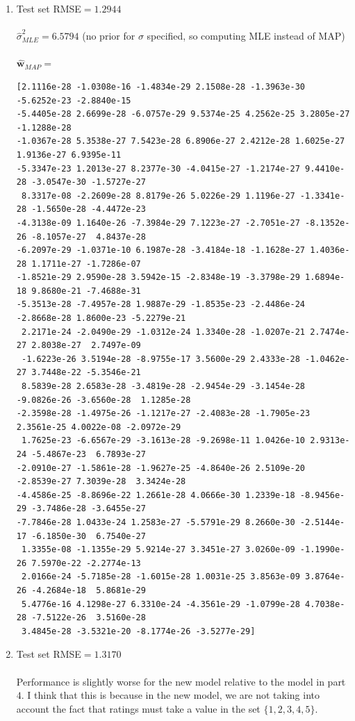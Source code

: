 \documentclass[10pt]{harvardml}
\theoremstyle{plain}
\begin{document}
\begin{enumerate}
\newpage

\item Test set RMSE$=1.2944$\\\\
$\hat\sigma^2_{MLE}=6.5794$ (no prior for $\sigma$ specified, so computing MLE instead of MAP)\\\\
$\mathbf{\hat w}_{MAP}=$
\begin{verbatim}
[2.1116e-28 -1.0308e-16 -1.4834e-29 2.1508e-28 -1.3963e-30 -5.6252e-23 -2.8840e-15
-5.4405e-28 2.6699e-28 -6.0757e-29 9.5374e-25 4.2562e-25 3.2805e-27 -1.1288e-28
-1.0367e-28 5.3538e-27 7.5423e-28 6.8906e-27 2.4212e-28 1.6025e-27 1.9136e-27 6.9395e-11
-5.3347e-23 1.2013e-27 8.2377e-30 -4.0415e-27 -1.2174e-27 9.4410e-28 -3.0547e-30 -1.5727e-27
 8.3317e-08 -2.2609e-28 8.8179e-26 5.0226e-29 1.1196e-27 -1.3341e-28 -1.5650e-28 -4.4472e-23
-4.3138e-09 1.1640e-26 -7.3984e-29 7.1223e-27 -2.7051e-27 -8.1352e-26 -8.1057e-27  4.8437e-28
-6.2097e-29 -1.0371e-10 6.1987e-28 -3.4184e-18 -1.1628e-27 1.4036e-28 1.1711e-27 -1.7286e-07
-1.8521e-29 2.9590e-28 3.5942e-15 -2.8348e-19 -3.3798e-29 1.6894e-18 9.8680e-21 -7.4688e-31
-5.3513e-28 -7.4957e-28 1.9887e-29 -1.8535e-23 -2.4486e-24 -2.8668e-28 1.8600e-23 -5.2279e-21
 2.2171e-24 -2.0490e-29 -1.0312e-24 1.3340e-28 -1.0207e-21 2.7474e-27 2.8038e-27  2.7497e-09
 -1.6223e-26 3.5194e-28 -8.9755e-17 3.5600e-29 2.4333e-28 -1.0462e-27 3.7448e-22 -5.3546e-21
 8.5839e-28 2.6583e-28 -3.4819e-28 -2.9454e-29 -3.1454e-28 -9.0826e-26 -3.6560e-28  1.1285e-28
-2.3598e-28 -1.4975e-26 -1.1217e-27 -2.4083e-28 -1.7905e-23 2.3561e-25 4.0022e-08 -2.0972e-29
 1.7625e-23 -6.6567e-29 -3.1613e-28 -9.2698e-11 1.0426e-10 2.9313e-24 -5.4867e-23  6.7893e-27
-2.0910e-27 -1.5861e-28 -1.9627e-25 -4.8640e-26 2.5109e-20 -2.8539e-27 7.3039e-28  3.3424e-28
-4.4586e-25 -8.8696e-22 1.2661e-28 4.0666e-30 1.2339e-18 -8.9456e-29 -3.7486e-28 -3.6455e-27
-7.7846e-28 1.0433e-24 1.2583e-27 -5.5791e-29 8.2660e-30 -2.5144e-17 -6.1850e-30  6.7540e-27
 1.3355e-08 -1.1355e-29 5.9214e-27 3.3451e-27 3.0260e-09 -1.1990e-26 7.5970e-22 -2.2774e-13
 2.0166e-24 -5.7185e-28 -1.6015e-28 1.0031e-25 3.8563e-09 3.8764e-26 -4.2684e-18  5.8681e-29
 5.4776e-16 4.1298e-27 6.3310e-24 -4.3561e-29 -1.0799e-28 4.7038e-28 -7.5122e-26  3.5160e-28
 3.4845e-28 -3.5321e-20 -8.1774e-26 -3.5277e-29]
\end{verbatim}
\item Test set RMSE$=1.3170$\\\\
Performance is slightly worse for the new model relative to the model in part $4$. I think that this is because in the new model, we are not taking into account the fact that ratings must take a value in the set $\{1,2,3,4,5\}$.

\end{enumerate}
\end{document}

